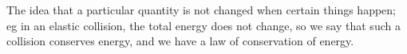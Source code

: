 The idea that a particular quantity is not
changed when certain things happen; eg in an
elastic collision, the total energy does not
change, so we say that such a collision conserves
energy, and we have a law of conservation of
energy.